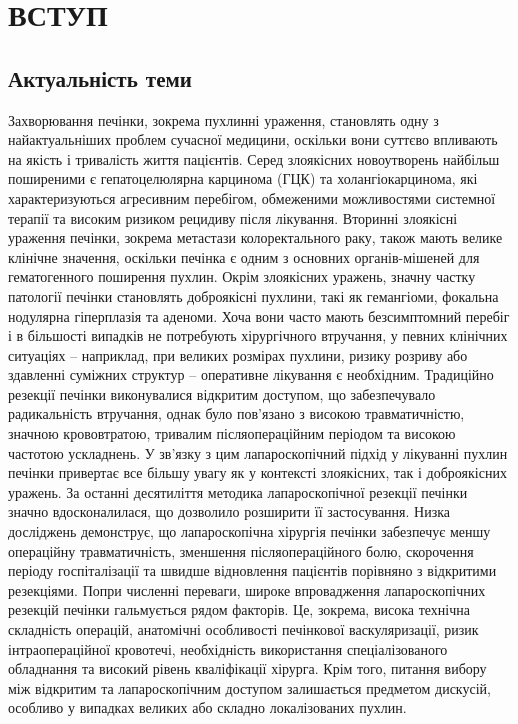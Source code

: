 \chapter{ВСТУП}

\section{Актуальність теми} 

Захворювання печінки, зокрема пухлинні ураження, становлять одну з найактуальніших проблем сучасної медицини, оскільки вони суттєво впливають на якість і тривалість життя пацієнтів. Серед злоякісних новоутворень найбільш поширеними є гепатоцелюлярна карцинома (ГЦК) та холангіокарцинома, які характеризуються агресивним перебігом, обмеженими можливостями системної терапії та високим ризиком рецидиву після лікування. Вторинні злоякісні ураження печінки, зокрема метастази колоректального раку, також мають велике клінічне значення, оскільки печінка є одним з основних органів-мішеней для гематогенного поширення пухлин.
Окрім злоякісних уражень, значну частку патології печінки становлять доброякісні пухлини, такі як гемангіоми, фокальна нодулярна гіперплазія та аденоми. Хоча вони часто мають безсимптомний перебіг і в більшості випадків не потребують хірургічного втручання, у певних клінічних ситуаціях – наприклад, при великих розмірах пухлини, ризику розриву або здавленні суміжних структур – оперативне лікування є необхідним. Традиційно резекції печінки виконувалися відкритим доступом, що забезпечувало радикальність втручання, однак було пов’язано з високою травматичністю, значною крововтратою, тривалим післяопераційним періодом та високою частотою ускладнень.
У зв’язку з цим лапароскопічний підхід у лікуванні пухлин печінки привертає все більшу увагу як у контексті злоякісних, так і доброякісних уражень. За останні десятиліття методика лапароскопічної резекції печінки значно вдосконалилася, що дозволило розширити її застосування. Низка досліджень демонструє, що лапароскопічна хірургія печінки забезпечує меншу операційну травматичність, зменшення післяопераційного болю, скорочення періоду госпіталізації та швидше відновлення пацієнтів порівняно з відкритими резекціями.
Попри численні переваги, широке впровадження лапароскопічних резекцій печінки гальмується рядом факторів. Це, зокрема, висока технічна складність операцій, анатомічні особливості печінкової васкуляризації, ризик інтраопераційної кровотечі, необхідність використання спеціалізованого обладнання та високий рівень кваліфікації хірурга. Крім того, питання вибору між відкритим та лапароскопічним доступом залишається предметом дискусій, особливо у випадках великих або складно локалізованих пухлин.
